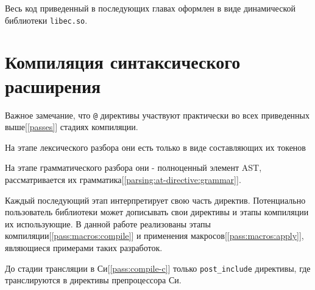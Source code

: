 Весь код приведенный в последующих главах оформлен в виде динамической библиотеки \verb|libec.so|.

\section{Компиляция синтаксического расширения}
Важное замечание, что \verb|@| директивы участвуют практически во всех приведенных выше[\ref{passes}] стадиях компиляции.

На этапе лексического разбора они есть только в виде составляющих их токенов 

На этапе грамматического разбора они - полноценный элемент AST, рассматривается их грамматика[\ref{parsing:at-directive:grammar}].

Каждый последующий этап интерпретирует свою часть директив. Потенциально пользователь библиотеки может дописывать свои директивы и этапы компиляции их использующие.
В данной работе реализованы этапы компиляции[\ref{pass:macros:compile}] и применения макросов[\ref{pass:macros:apply}], являющиеся примерами таких разработок.

До стадии трансляции в Си[\ref{pass:compile-c}]  только \verb|post_include| директивы, где транслируются в директивы препроцессора Си.



















